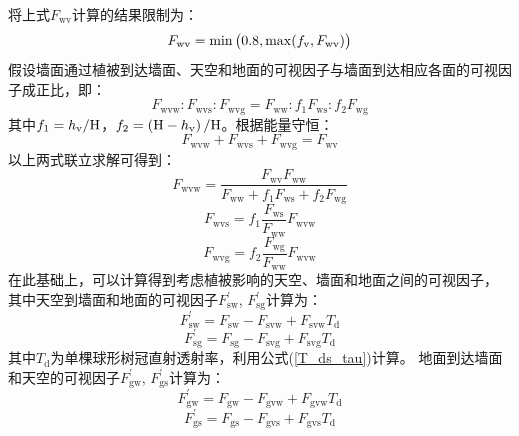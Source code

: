 将上式$F_{\mathrm{wv}}$计算的结果限制为：
\begin{equation}
  F_{\mathrm{wv}} = \min \big(0.8, \max (f_{\rm v}, F_{\mathrm{wv}})\big)
\end{equation}
假设墙面通过植被到达墙面、天空和地面的可视因子与墙面到达相应各面的可视因子成正比，即：
\begin{equation}
  F_{\mathrm{wvw}}: F_{\mathrm{wvs}}: F_{\mathrm{wvg}}=F_{\mathrm{ww}}: f_{\mathrm{1}} F_{\mathrm{ws}}: f_{\mathrm{2}} F_{\mathrm{w g}}
\end{equation}
其中$f_1=h_{\rm v}/{\rm H}$，$f_2=\left({\rm H}-h_{\rm v}\right)/{\rm H}$。根据能量守恒：
\begin{equation}
  F_{\mathrm{wvw}}+F_{\mathrm{wvs}}+F_{\mathrm{wvg}}=F_{\mathrm{w v}}
\end{equation}
以上两式联立求解可得到：
\begin{equation}
  F_{\mathrm{wvw}}=\frac{F_{\mathrm{w v}} F_{\mathrm{ww}}}{F_{\mathrm{ww}}+f_{\mathrm{1}} F_{\mathrm{ws}}+f_{\mathrm{2}} F_{\mathrm{w g}}}
\end{equation}
\begin{equation}
  F_{\mathrm{wvs}}=f_{\mathrm{1}} \frac{F_{\mathrm{ws}}}{F_{\mathrm{ww}}} F_{\mathrm{wvw}}
\end{equation}
\begin{equation}
  F_{\mathrm{wvg}}=f_{\mathrm{2}} \frac{F_{\mathrm{w g}}}{F_{\mathrm{ww}}} F_{\mathrm{wvw}}
\end{equation}
在此基础上，可以计算得到考虑植被影响的天空、墙面和地面之间的可视因子，
其中天空到墙面和地面的可视因子$F_{\mathrm{sw}}^\prime$, $F_{\mathrm{sg}}^\prime$计算为：
\begin{equation}
  F_{\mathrm{sw}}^{\prime}=F_{\mathrm{sw}}-F_{\mathrm{svw}}+F_{\mathrm{svw}} T_{\mathrm{d}}
\end{equation}
\begin{equation}
  F_{\mathrm{sg}}^{\prime}=F_{\mathrm{sg}}-F_{\mathrm{svg}}+F_{\mathrm{svg}} T_{\mathrm{d}}
\end{equation}
其中$T_{\mathrm {d}}$为单棵球形树冠直射透射率，利用公式(\ref{T_ds_tau})计算。
地面到达墙面和天空的可视因子$F_{\mathrm{gw}}^\prime$, $F_{\mathrm{gs}}^\prime$计算为：
\begin{equation}
  F_{\mathrm{gw}}^{\prime}=F_{\mathrm{gw}}-F_{\mathrm{gvw}}+F_{\mathrm{gvw}} T_{\mathrm{d}}
\end{equation}
\begin{equation}
  F_{\mathrm{gs}}^{\prime}=F_{\mathrm{gs}}-F_{\mathrm{gvs}}+F_{\mathrm{gvs}} T_{\mathrm{d}}
\end{equation}
